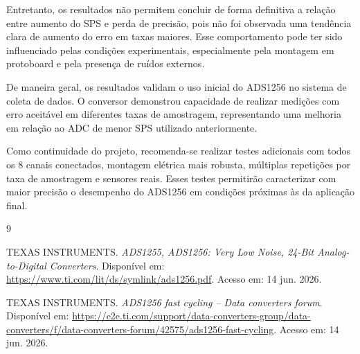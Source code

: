 \documentclass[12pt, a4paper]{article}
\begin{document}
Entretanto, os resultados não permitem concluir de forma definitiva a relação entre aumento do SPS e perda de precisão, 
pois não foi observada uma tendência clara de aumento do erro em taxas maiores. 
Esse comportamento pode ter sido influenciado pelas condições experimentais, especialmente pela montagem em protoboard e pela presença de ruídos externos.

De maneira geral, os resultados validam o uso inicial do ADS1256 no sistema de coleta de dados. 
O conversor demonstrou capacidade de realizar medições com erro aceitável em diferentes taxas de amostragem, 
representando uma melhoria em relação ao ADC de menor SPS utilizado anteriormente.

Como continuidade do projeto, recomenda-se realizar testes adicionais com todos os 8 canais conectados, 
montagem elétrica mais robusta, múltiplas repetições por taxa de amostragem e sensores reais. 
Esses testes permitirão caracterizar com maior precisão o desempenho do ADS1256 em condições próximas às da aplicação final.

\begin{thebibliography}{9}

TEXAS INSTRUMENTS. \textit{ADS1255, ADS1256: Very Low Noise, 24-Bit Analog-to-Digital Converters}. Disponível em: \url{https://www.ti.com/lit/ds/symlink/ads1256.pdf}. Acesso em: 14 jun. 2026.

TEXAS INSTRUMENTS. \textit{ADS1256 fast cycling -- Data converters forum}. Disponível em: \url{https://e2e.ti.com/support/data-converters-group/data-converters/f/data-converters-forum/42575/ads1256-fast-cycling}. Acesso em: 14 jun. 2026.

\end{thebibliography}
\end{document}
